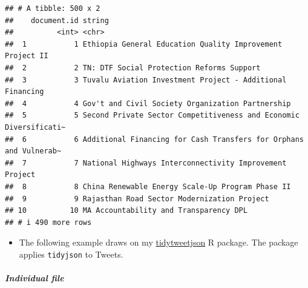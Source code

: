 \documentclass[
]{book}
\providecommand{\tightlist}{%
  \setlength{\itemsep}{0pt}\setlength{\parskip}{0pt}}
\begin{document}
\begin{verbatim}
## # A tibble: 500 x 2
##    document.id string                                                           
##          <int> <chr>                                                            
##  1           1 Ethiopia General Education Quality Improvement Project II        
##  2           2 TN: DTF Social Protection Reforms Support                        
##  3           3 Tuvalu Aviation Investment Project - Additional Financing        
##  4           4 Gov't and Civil Society Organization Partnership                 
##  5           5 Second Private Sector Competitiveness and Economic Diversificati~
##  6           6 Additional Financing for Cash Transfers for Orphans and Vulnerab~
##  7           7 National Highways Interconnectivity Improvement Project          
##  8           8 China Renewable Energy Scale-Up Program Phase II                 
##  9           9 Rajasthan Road Sector Modernization Project                      
## 10          10 MA Accountability and Transparency DPL                           
## # i 490 more rows
\end{verbatim}

\begin{itemize}
\tightlist
\item
  The following example draws on my \href{https://github.com/jaeyk/tidytweetjson}{tidytweetjson} R package. The package applies \texttt{tidyjson} to Tweets.
\end{itemize}

\subparagraph{Individual file}\label{individual-file}
\end{document}
